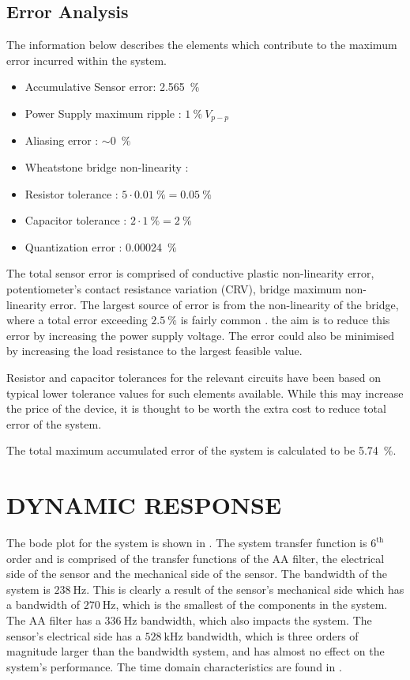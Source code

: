 \documentclass[10pt,twocolumn]{witseiepaper}
\begin{document}
\subsection{Error Analysis}

The information below describes the elements which contribute to the maximum error incurred within the system.

\begin{itemize}
	\item Accumulative Sensor error: 2.565~$\%$
	\item Power Supply maximum ripple : $1~\%~V_{p-p}$
	\item Aliasing error : $\sim$0~$\%$
	\item Wheatstone bridge non-linearity : 
	\item Resistor tolerance : $5\cdot0.01~\% = 0.05~\%$
	\item Capacitor tolerance : $2\cdot1~\% = 2~\%$
	\item Quantization error : 0.00024~$\%$
\end{itemize}

The total sensor error is comprised of conductive plastic non-linearity error, potentiometer's contact resistance variation (CRV), bridge maximum non-linearity error. The largest source of error is from the non-linearity of the bridge, where a total error exceeding $2.5~\%$ is fairly common \cite{nonlinearity}. the aim is to reduce this error by increasing the power supply voltage. The error could also be minimised by increasing the load resistance to the largest feasible value.

Resistor and capacitor tolerances for the relevant circuits have been based on typical lower tolerance values for such elements available. While this may increase the price of the device, it is thought to be worth the extra cost to reduce total error of the system.

The total maximum accumulated error of the system is calculated to be 5.74~$\%$. 

\section{DYNAMIC RESPONSE}

The bode plot for the system is shown in . The system transfer function is $\mathrm{6^{th}}$ order and is comprised of the transfer functions of the AA filter, the electrical side of the sensor and the mechanical side of the sensor. The bandwidth of the system is $238~\mathrm{Hz}$. This is clearly a result of the sensor's mechanical side which has a bandwidth of $270~\mathrm{Hz}$, which is the smallest of the components in the system. The AA filter has a $336~\mathrm{Hz}$ bandwidth, which also impacts the system. The sensor's electrical side has a $528~\mathrm{kHz}$ bandwidth, which is three orders of magnitude larger than the  bandwidth system, and has almost no effect on the system's performance. The time domain characteristics are found in .
\end{document}
